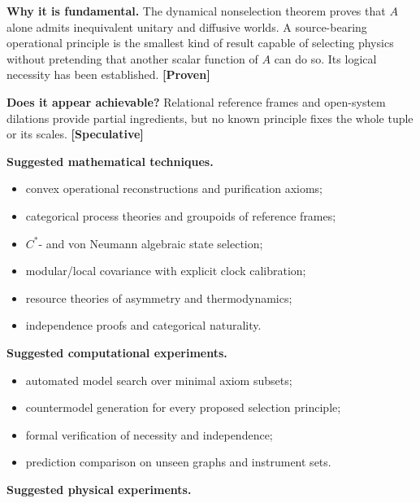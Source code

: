 \documentclass[11pt,a4paper,openany]{report}
\newcommand{\statusProven}{\textcolor{fingreen}{[Proven]}}
\newcommand{\statusSpeculative}{\textcolor{finorange}{[Speculative]}}
\begin{document}
\textbf{Why it is fundamental.} The dynamical nonselection theorem proves that \(A\) alone admits inequivalent unitary and diffusive worlds. A source-bearing operational principle is the smallest kind of result capable of selecting physics without pretending that another scalar function of \(A\) can do so. Its logical necessity has been established. \textbf{\statusProven{}}

\textbf{Does it appear achievable?} Relational reference frames and open-system dilations provide partial ingredients, but no known principle fixes the whole tuple or its scales. \textbf{\statusSpeculative{}}

\textbf{Suggested mathematical techniques.}

\begin{itemize}
\item 
convex operational reconstructions and purification axioms;

\item 
categorical process theories and groupoids of reference frames;

\item 
\(C^*\)- and von Neumann algebraic state selection;

\item 
modular/\allowbreak{}local covariance with explicit clock calibration;

\item 
resource theories of asymmetry and thermodynamics;

\item 
independence proofs and categorical naturality.

\end{itemize}

\textbf{Suggested computational experiments.}

\begin{itemize}
\item 
automated model search over minimal axiom subsets;

\item 
countermodel generation for every proposed selection principle;

\item 
formal verification of necessity and independence;

\item 
prediction comparison on unseen graphs and instrument sets.

\end{itemize}

\textbf{Suggested physical experiments.}
\end{document}
